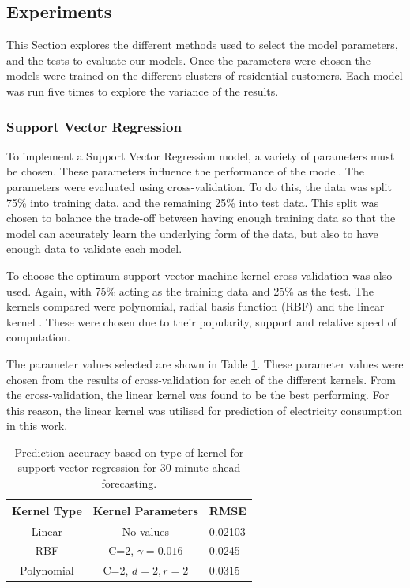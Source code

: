 \subsection{Experiments}

This Section explores the different methods used to select the model parameters, and the tests to evaluate our models. Once the parameters were chosen the models were trained on the different clusters of residential customers. Each model was run five times to explore the variance of the results.  

\subsubsection{Support Vector Regression}

To implement a Support Vector Regression model, a variety of parameters must be chosen. These parameters influence the performance of the model. The parameters were evaluated using cross-validation. To do this, the data was split 75\% into training data, and the remaining 25\% into test data. This split was chosen to balance the trade-off between having enough training data so that the model can accurately learn the underlying form of the data, but also to have enough data to validate each model.

To choose the optimum support vector machine kernel cross-validation was also used. Again, with 75\% acting as the training data and 25\% as the test. The kernels compared were polynomial, radial basis function (RBF) and the linear kernel \cite{Chang2010, theodoridis2009pattern}. These were chosen due to their popularity, support and relative speed of computation.

The parameter values selected are shown in Table \ref{forecasting:tab:kernel}. These parameter values were chosen from the results of cross-validation for each of the different kernels.  From the cross-validation, the linear kernel was found to be the best performing. For this reason, the linear kernel was utilised for prediction of electricity consumption in this work.

\begin{table}
	\centering
	\begin{tabular}{ccl}
		\toprule
		Kernel Type& Kernel Parameters & RMSE\\
		\midrule
		Linear & No values & 0.02103\\
		RBF & C=2, $\gamma=0.016$ & 0.0245\\
		Polynomial & C=2, $d=2, r=2$ & 0.0315 \\
		\bottomrule
	\end{tabular}
	\caption{Prediction accuracy based on type of kernel for support vector regression for 30-minute ahead forecasting.}
	\label{forecasting:tab:kernel}
\end{table}


